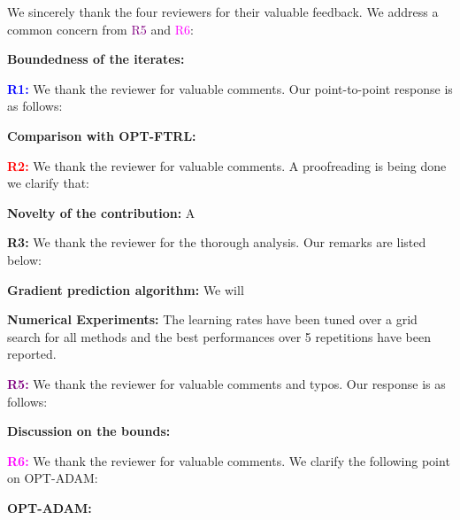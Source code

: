 \documentclass{article}
\begin{document}
We sincerely thank the four reviewers for their valuable feedback. We address a common concern from \textcolor{purple}{R5} and \textcolor{magenta}{R6}:

\textbf{Boundedness of the iterates:}  
\vspace{0.01in}

\textbf{\textcolor{blue}{R1:}} We thank the reviewer for valuable comments. Our point-to-point response is as follows:\vspace{-5pt}


\textbf{Comparison with OPT-FTRL:} 

\vspace{0.01in}


\textbf{\textcolor{red}{R2:}} We thank the reviewer for valuable comments. A proofreading is being done we clarify that:\vspace{-5pt}

\textbf{Novelty of the contribution:} 
A

\vspace{0.01in}
\textbf{\textcolor{green!50!black}{R3:}} We thank the reviewer for the thorough analysis. Our remarks are listed below:\vspace{-5pt}

\textbf{Gradient prediction algorithm:} We will \vspace{-5pt}

\textbf{Numerical Experiments:} The learning rates have been tuned over a grid search for all methods and the best performances over 5 repetitions have been reported.

\vspace{0.01in}

\textbf{\textcolor{purple}{R5:}} We thank the reviewer for valuable comments and typos. Our response is as follows:\vspace{-5pt}

\textbf{Discussion on the bounds:} 

\vspace{0.01in}

\textbf{\textcolor{magenta}{R6:}} We thank the reviewer for valuable comments. We clarify the following point on OPT-ADAM:\vspace{-5pt}

\textbf{OPT-ADAM:} 
\end{document}
